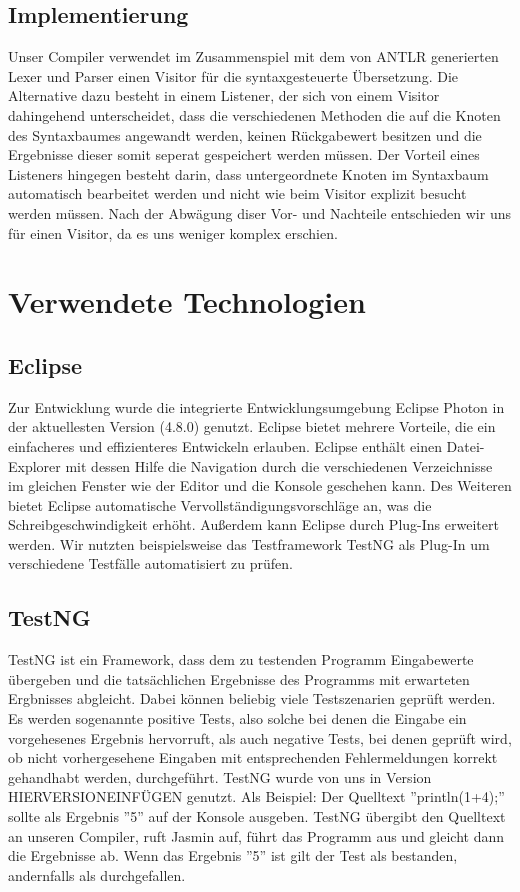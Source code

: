 \documentclass[12pt, a4paper, oneside, ngerman]{article}
\begin{document}
\subsection{Implementierung}
Unser Compiler verwendet im Zusammenspiel mit dem von ANTLR generierten Lexer und Parser einen Visitor für die syntaxgesteuerte Übersetzung. Die Alternative dazu besteht in einem Listener, der sich von einem Visitor dahingehend unterscheidet, dass die verschiedenen Methoden die auf die Knoten des Syntaxbaumes angewandt werden, keinen Rückgabewert besitzen und die Ergebnisse dieser somit seperat gespeichert werden müssen. Der Vorteil eines Listeners hingegen besteht darin, dass untergeordnete Knoten im Syntaxbaum automatisch bearbeitet werden und nicht wie beim Visitor explizit besucht werden müssen. Nach der Abwägung diser Vor- und Nachteile entschieden wir uns für einen Visitor, da es uns weniger komplex erschien.




\pagebreak
\section{Verwendete Technologien}

\subsection{Eclipse}
Zur Entwicklung wurde die integrierte Entwicklungsumgebung Eclipse Photon in der aktuellesten Version (4.8.0) genutzt. 
Eclipse bietet mehrere Vorteile, die ein einfacheres und effizienteres Entwickeln erlauben. Eclipse enthält einen Datei-Explorer mit dessen Hilfe die Navigation durch die verschiedenen Verzeichnisse im gleichen Fenster wie der Editor und die Konsole geschehen kann. Des Weiteren bietet Eclipse automatische Vervollständigungsvorschläge an, was die Schreibgeschwindigkeit erhöht. 
Außerdem kann Eclipse durch Plug-Ins erweitert werden. Wir nutzten beispielsweise das Testframework TestNG als Plug-In um verschiedene Testfälle automatisiert zu prüfen.

\subsection{TestNG}
TestNG ist ein Framework, dass dem zu testenden Programm Eingabewerte übergeben und die tatsächlichen Ergebnisse des Programms mit erwarteten Ergbnisses abgleicht. Dabei können beliebig viele Testszenarien geprüft werden. Es werden sogenannte positive Tests, also solche bei denen die Eingabe ein vorgehesenes Ergebnis hervorruft, als auch negative Tests, bei denen geprüft wird, ob nicht vorhergesehene Eingaben mit entsprechenden Fehlermeldungen korrekt gehandhabt werden, durchgeführt. TestNG wurde von uns in Version HIERVERSIONEINFÜGEN genutzt.
\linebreak
Als Beispiel: Der Quelltext ''println(1+4);'' sollte als Ergebnis ''5'' auf der Konsole ausgeben. TestNG übergibt den Quelltext an unseren Compiler, ruft Jasmin auf, führt das Programm aus und gleicht dann die Ergebnisse ab. Wenn das Ergebnis ''5'' ist gilt der Test als bestanden, andernfalls als durchgefallen. 
\end{document}
